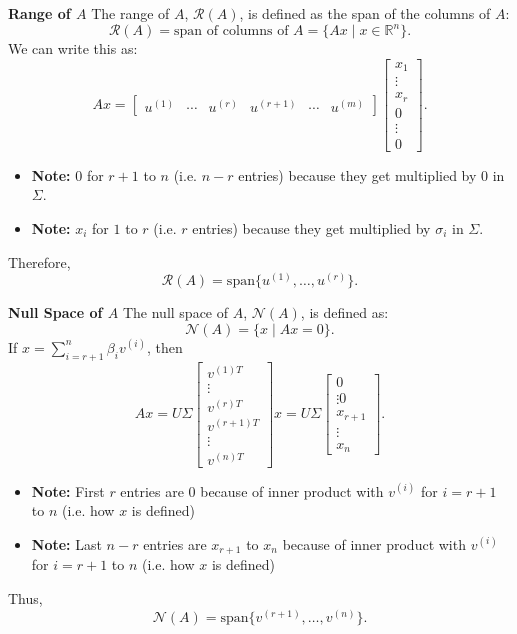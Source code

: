 \begin{derivation}
    \textbf{Range of \( A \)}
    The range of \( A \), \( \mathcal{R}(A) \), is defined as the span of the columns of \( A \):
    \[
    \mathcal{R}(A) = \text{span of columns of } A = \{ A x \mid x \in \mathbb{R}^n \}.
    \]
    We can write this as:
    \[
    A x = 
    \begin{bmatrix}
    u^{(1)} & \cdots & u^{(r)} & u^{(r+1)} & \cdots & u^{(m)}
    \end{bmatrix}
    \begin{bmatrix}
    x_1 \\
    \vdots \\
    x_r \\
    0 \\
    \vdots \\
    0
    \end{bmatrix}.
    \]
    \begin{itemize}
        \item \textbf{Note:} $0$ for $r+1$ to $n$ (i.e. $n-r$ entries) because they get multiplied by $0$ in $\Sigma$. 
        \item \textbf{Note:} $x_i$ for $1$ to $r$ (i.e. $r$ entries) because they get multiplied by $\sigma_i$ in $\Sigma$.
    \end{itemize}
    Therefore,
    \[
    \mathcal{R}(A) = \text{span} \{ u^{(1)}, \dots, u^{(r)} \}.
    \]
    \vspace{1em}

    \textbf{Null Space of \( A \)}
    The null space of \( A \), \( \mathcal{N}(A) \), is defined as:
    \[
    \mathcal{N}(A) = \{ x \mid A x = 0 \}.
    \]
    If \( x = \sum_{i=r+1}^n \beta_i v^{(i)} \), then
    \[
    A x = U \Sigma 
    \begin{bmatrix}
    v^{(1) T} \\
    \vdots \\
    v^{(r) T} \\
    v^{(r+1) T} \\
    \vdots \\
    v^{(n) T}
    \end{bmatrix} x =  U \Sigma \begin{bmatrix}
        0 \\
        \vdots 
        0 \\
        x_{r+1} \\
        \vdots \\
        x_n
        \end{bmatrix}.
    \]
    \begin{itemize}
        \item \textbf{Note:} First $r$ entries are $0$ because of inner product with $v^{(i)}$ for $i=r+1$ to $n$ (i.e. how $x$ is defined)
        \item \textbf{Note:} Last $n-r$ entries are $x_{r+1}$ to $x_n$ because of inner product with $v^{(i)}$ for $i=r+1$ to $n$ (i.e. how $x$ is defined)
    \end{itemize}
    Thus,
    \[
    \mathcal{N}(A) = \text{span} \{ v^{(r+1)}, \dots, v^{(n)} \}.
    \]
\end{derivation}

